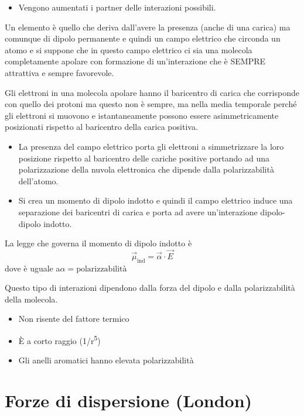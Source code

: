 \begin{itemize}
\item
  Vengono aumentati i partner delle interazioni possibili.
\end{itemize}

Un elemento è quello che deriva dall'avere la presenza (anche di una
carica) ma comunque di dipolo permanente e quindi un campo elettrico che
circonda un atomo e si suppone che in questo campo elettrico ci sia una
molecola completamente apolare con formazione di un'interazione che è
SEMPRE attrattiva e sempre favorevole.

Gli elettroni in una molecola apolare hanno il baricentro di carica che
corrisponde con quello dei protoni ma questo non è sempre, ma nella
media temporale perché gli elettroni si muovono e istantaneamente
possono essere asimmetricamente posizionati rispetto al baricentro della
carica positiva.

\begin{itemize}
\item
  La presenza del campo elettrico porta gli elettroni a simmetrizzare la
  loro posizione rispetto al baricentro delle cariche positive portando
  ad una polarizzazione della nuvola elettronica che dipende dalla
  polarizzabilità dell'atomo.
\item
  Si crea un momento di dipolo indotto e quindi il campo elettrico
  induce una separazione dei baricentri di carica e porta ad avere
  un'interazione dipolo-dipolo indotto.
\end{itemize}


La legge che governa il momento di dipolo indotto è
\[
  \vec{\mu}_{\text{ind}} = \vec{\alpha} \cdot \vec{E}
\]
dove \alpha{} è uguale a\( \alpha = \text{polarizzabilità}\)

Questo tipo di interazioni dipendono dalla forza del dipolo e dalla
polarizzabilità della molecola.

\begin{itemize}
\item
  Non risente del fattore termico
\item
  È a corto raggio (1/r\textsuperscript{5})
\item
  Gli anelli aromatici hanno elevata polarizzabilità
\end{itemize}

\section{Forze di dispersione (London)}

